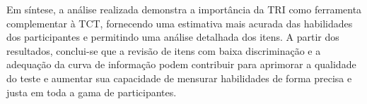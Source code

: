 Em síntese, a análise realizada demonstra a importância da TRI como ferramenta complementar à TCT, fornecendo uma estimativa mais acurada das habilidades dos participantes e permitindo uma análise detalhada dos itens. A partir dos resultados, conclui-se que a revisão de itens com baixa discriminação e a adequação da curva de informação podem contribuir para aprimorar a qualidade do teste e aumentar sua capacidade de mensurar habilidades de forma precisa e justa em toda a gama de participantes.
